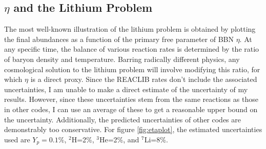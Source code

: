 \subsection[Eta and the Lithium Problem]{$\eta$ and the Lithium Problem}
The most well-known illustration of the lithium problem is obtained by plotting the final abundances as a function of the primary free parameter of BBN $\eta$. At any specific time, the balance of various reaction rates is determined by the ratio of baryon density and temperature. Barring radically different physics, any cosmological solution to the lithium problem will involve modifying this ratio, for which $\eta$ is a direct proxy. Since the REACLIB rates don't include the associated uncertainties, I am unable to make a direct estimate of the uncertainty of my results. However, since these uncertainties stem from the same reactions as those in other codes, I can use an average of these to get a reasonable upper bound on the uncertainty. Additionally, the predicted uncertainties of other codes are demonstrably too conservative. For figure \ref{fig:etaplot}, the estimated uncertainties used are $ Y_p=0.1\%$, $^{2}$H=2\%, $^{3}$He=2\%, and $^{7}$Li=8\%.

